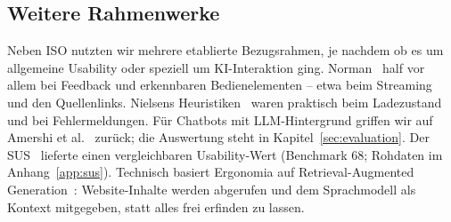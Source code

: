 \subsection{Weitere Rahmenwerke}

Neben ISO nutzten wir mehrere etablierte Bezugsrahmen, je nachdem ob es um allgemeine Usability oder speziell um KI-Interaktion ging. Norman~\cite{norman2013} half vor allem bei Feedback und erkennbaren Bedienelementen -- etwa beim Streaming und den Quellenlinks. Nielsens Heuristiken~\cite{nielsen1994} waren praktisch beim Ladezustand und bei Fehlermeldungen. Für Chatbots mit LLM-Hintergrund griffen wir auf Amershi et al.~\cite{amershi2019} zurück; die Auswertung steht in Kapitel~\ref{sec:evaluation}. Der SUS~\cite{lewis2018} lieferte einen vergleichbaren Usability-Wert (Benchmark 68; Rohdaten im Anhang~\ref{app:sus}). Technisch basiert Ergonomia auf Retrieval-Augmented Generation~\cite{lewis2020rag}: Website-Inhalte werden abgerufen und dem Sprachmodell als Kontext mitgegeben, statt alles frei erfinden zu lassen.
